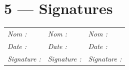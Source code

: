 \documentclass[11pt,a4paper,oneside]{report}
\begin{document}
\section*{5 — Signatures}

\renewcommand{\arraystretch}{2.5}
\begin{tabularx}{\textwidth}{Y Y Y}
\toprule
{} &  &  \\
\midrule
\textit{Nom :} & \textit{Nom :} & \textit{Nom :} \\
\textit{Date :} & \textit{Date :} & \textit{Date :} \\
\textit{Signature :} & \textit{Signature :} & \textit{Signature :} \\
\bottomrule
\end{tabularx}
\end{document}
